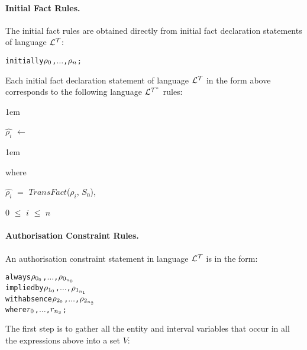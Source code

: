 \documentclass[11pt]{report}
\newenvironment{vverbatim}
{
  \begin{alltt}
}
{
    \vspace{-\baselineskip}
  \end{alltt}
}
\newenvironment{vquote}
{
  \begin{list}{}{\leftmargin 1em}\item[]
}
{
  \end{list}
}
\begin{document}
          \paragraph
            {\bf Initial Fact Rules.}

            The initial fact rules are obtained directly from initial fact
            declaration statements of language ${\cal L^T}$:

            \begin{vverbatim}
  initially \(\rho\sb{0}\), \(\ldots\), \(\rho\sb{n}\);
            \end{vverbatim}

            \noindent
            Each initial fact declaration statement of language ${\cal L^T}$
            in the form above corresponds to the following language
            ${\cal L^{T^*}}$ rules:

            \begin{vquote}
              $\hat{\rho_i}$ $\leftarrow$
            \end{vquote}

            \begin{vquote}
              where

              \hspace{1em}
              $\hat{\rho_i}$ $=$ $TransFact$($\rho_i$, $S_0$),

              \hspace{1em}
              $0$ $\leq$ $i$ $\leq$ $n$
            \end{vquote}

          \paragraph
            {\bf Authorisation Constraint Rules.}

            An authorisation constraint statement in language ${\cal L^T}$
            is in the form:

            \begin{vverbatim}
  always \(\rho\sb{0\sb{0}}\), \(\ldots\), \(\rho\sb{0\sb{n\sb{0}}}\)
    implied by \(\rho\sb{1\sb{0}}\), \(\ldots\), \(\rho\sb{1\sb{n\sb{1}}}\)
    with absence \(\rho\sb{2\sb{0}}\), \(\ldots\), \(\rho\sb{2\sb{n\sb{2}}}\)
    where \(r\sb{0}\), \(\ldots\), \(r\sb{n\sb{3}}\);
            \end{vverbatim}

            The first step is to gather all the entity and interval
            variables that occur in all the expressions above into a set $V$:
\end{document}
